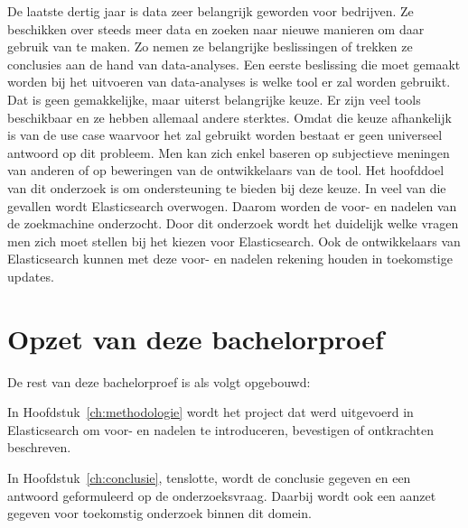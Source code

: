 De laatste dertig jaar is data zeer belangrijk geworden voor bedrijven. Ze beschikken over steeds meer data en zoeken naar nieuwe manieren om daar gebruik van te maken. Zo nemen ze belangrijke beslissingen of trekken ze conclusies aan de hand van data-analyses. Een eerste beslissing die moet gemaakt worden bij het uitvoeren van data-analyses is welke tool er zal worden gebruikt. Dat is geen gemakkelijke, maar uiterst belangrijke keuze. Er zijn veel tools beschikbaar en ze hebben allemaal andere sterktes. Omdat die keuze afhankelijk is van de use case waarvoor het zal gebruikt worden bestaat er geen universeel antwoord op dit probleem. Men kan zich enkel baseren op subjectieve meningen van anderen of op beweringen van de ontwikkelaars van de tool. Het hoofddoel van dit onderzoek is om ondersteuning te bieden bij deze keuze. In veel van die gevallen wordt Elasticsearch overwogen. Daarom worden de voor- en nadelen van de zoekmachine onderzocht. Door dit onderzoek wordt het duidelijk welke vragen men zich moet stellen bij het kiezen voor Elasticsearch. Ook de ontwikkelaars van Elasticsearch kunnen met deze voor- en nadelen rekening houden in toekomstige updates.

\section{Opzet van deze bachelorproef}
\label{sec:opzet-bachelorproef}


De rest van deze bachelorproef is als volgt opgebouwd:

In Hoofdstuk~\ref{ch:methodologie} wordt het project dat werd uitgevoerd in Elasticsearch om voor- en nadelen te introduceren, bevestigen of ontkrachten beschreven.

In Hoofdstuk~\ref{ch:conclusie}, tenslotte, wordt de conclusie gegeven en een antwoord geformuleerd op de onderzoeksvraag. Daarbij wordt ook een aanzet gegeven voor toekomstig onderzoek binnen dit domein.

